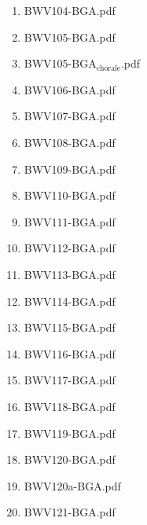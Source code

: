 \documentclass[11pt]{article}
\begin{document}
\begin{enumerate}
\begin{enumerate}
\begin{enumerate}
\item BWV104-BGA.pdf
\label{sec-1-1-1-1-44-6-7-1-122}

\item BWV105-BGA.pdf
\label{sec-1-1-1-1-44-6-7-1-123}

\item BWV105-BGA$_{\text{chorale}}$.pdf
\label{sec-1-1-1-1-44-6-7-1-124}

\item BWV106-BGA.pdf
\label{sec-1-1-1-1-44-6-7-1-125}

\item BWV107-BGA.pdf
\label{sec-1-1-1-1-44-6-7-1-126}

\item BWV108-BGA.pdf
\label{sec-1-1-1-1-44-6-7-1-127}

\item BWV109-BGA.pdf
\label{sec-1-1-1-1-44-6-7-1-128}

\item BWV110-BGA.pdf
\label{sec-1-1-1-1-44-6-7-1-129}

\item BWV111-BGA.pdf
\label{sec-1-1-1-1-44-6-7-1-130}

\item BWV112-BGA.pdf
\label{sec-1-1-1-1-44-6-7-1-131}

\item BWV113-BGA.pdf
\label{sec-1-1-1-1-44-6-7-1-132}

\item BWV114-BGA.pdf
\label{sec-1-1-1-1-44-6-7-1-133}

\item BWV115-BGA.pdf
\label{sec-1-1-1-1-44-6-7-1-134}

\item BWV116-BGA.pdf
\label{sec-1-1-1-1-44-6-7-1-135}

\item BWV117-BGA.pdf
\label{sec-1-1-1-1-44-6-7-1-136}

\item BWV118-BGA.pdf
\label{sec-1-1-1-1-44-6-7-1-137}

\item BWV119-BGA.pdf
\label{sec-1-1-1-1-44-6-7-1-138}

\item BWV120-BGA.pdf
\label{sec-1-1-1-1-44-6-7-1-139}

\item BWV120a-BGA.pdf
\label{sec-1-1-1-1-44-6-7-1-140}

\item BWV121-BGA.pdf
\label{sec-1-1-1-1-44-6-7-1-141}


\end{enumerate}
\end{enumerate}
\end{enumerate}
\end{document}

